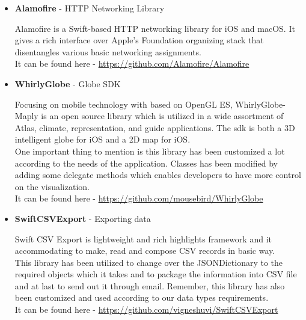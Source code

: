 \begin{itemize}
    \item \textbf{Alamofire} - HTTP Networking Library
    
    Alamofire is a Swift-based HTTP networking library for \gls{iOS} and \gls{macOS}. It gives a rich interface over Apple's Foundation organizing stack that disentangles various basic networking assignments.\\
    
    It can be found here - \url{https://github.com/Alamofire/Alamofire} \\
   
    \item \textbf{WhirlyGlobe} - Globe SDK
    
    Focusing on mobile technology with based on OpenGL ES, WhirlyGlobe-Maply is an open source library which is utilized in a wide assortment of Atlas, climate, representation, and guide applications. The \gls{sdk} is both a 3D intelligent globe for \gls{iOS} and a 2D map for \gls{iOS}. \\
    
    One important thing to mention is this library has been customized a lot according to the needs of the application. Classes has been modified by adding some delegate methods which enables developers to have more control on the visualization. \\
    
    It can be found here - \url{https://github.com/mousebird/WhirlyGlobe} \\
    
    \item \textbf{SwiftCSVExport} - Exporting data
    
    Swift CSV Export is lightweight and rich highlights framework and it accommodating to make, read and compose CSV records in basic way. \\
    
    This library has been utilized to change over the JSONDictionary to the required objects which it takes and to package the information into CSV file and at last to send out it through email. Remember, this library has also been customized and used according to our data types requirements. \\
    
    It can be found here - \url{https://github.com/vigneshuvi/SwiftCSVExport} \\ 
    
\end{itemize}

